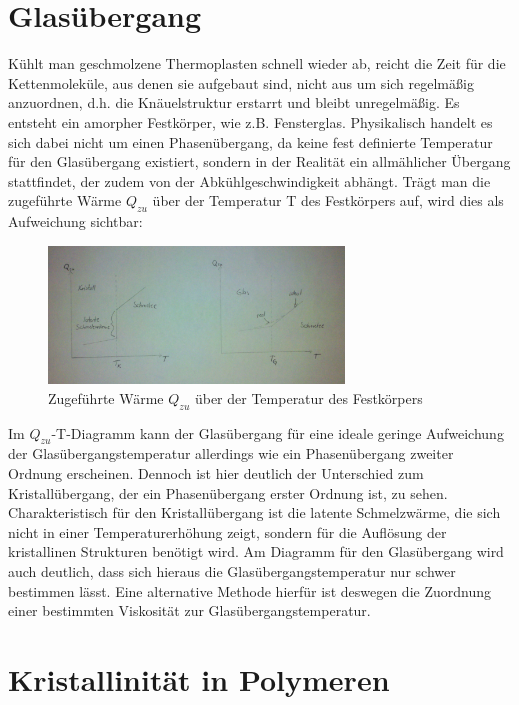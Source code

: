 \documentclass[bigchapter,colorback,accentcolor=tud4b,linedtoc,11pt]{tudreport}
\begin{document}
\section{Glasübergang}

Kühlt man geschmolzene Thermoplasten schnell wieder ab, reicht die Zeit für die Kettenmoleküle, aus denen sie aufgebaut sind, nicht aus um sich regelmäßig anzuordnen, d.h. die Knäuelstruktur erstarrt und bleibt unregelmäßig. Es entsteht ein amorpher Festkörper, wie z.B. Fensterglas. Physikalisch handelt es sich dabei nicht um einen Phasenübergang, da keine fest definierte Temperatur für den Glasübergang existiert, sondern in der Realität ein allmählicher Übergang stattfindet, der zudem von der Abkühlgeschwindigkeit abhängt. Trägt man die zugeführte Wärme $Q_{zu}$ über der Temperatur T des Festkörpers auf, wird dies als Aufweichung sichtbar:


\begin{figure}[h] 
  \centering
     \includegraphics[width=0.7\textwidth]{data/glastemperatur.jpg}
  \caption{Zugeführte Wärme $Q_{zu}$ über der Temperatur des Festkörpers}
  \label{fig:Bild1}
\end{figure}

Im $Q_{zu}$-T-Diagramm kann der Glasübergang für eine ideale geringe Aufweichung der Glasübergangstemperatur allerdings wie ein Phasenübergang zweiter Ordnung erscheinen. Dennoch ist hier deutlich der Unterschied zum Kristallübergang, der ein Phasenübergang erster Ordnung ist, zu sehen. Charakteristisch für den Kristallübergang ist die latente Schmelzwärme, die sich nicht in einer Temperaturerhöhung zeigt, sondern für die Auflösung der kristallinen Strukturen benötigt wird. Am Diagramm für den Glasübergang wird auch deutlich, dass sich hieraus die Glasübergangstemperatur nur schwer bestimmen lässt. Eine alternative Methode hierfür ist deswegen die Zuordnung einer bestimmten Viskosität zur Glasübergangstemperatur.

\section{Kristallinität in Polymeren}
\end{document}
